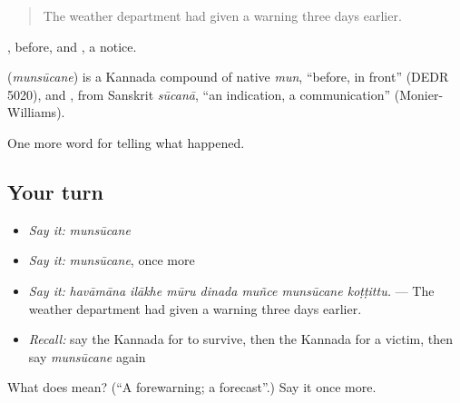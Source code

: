 \begin{quote}
The weather department had given a warning three days earlier.
\end{quote}

, before, and , a notice.

\begin{cousinweb}
\textbf{} (\emph{munsūcane}) is a Kannada compound of native \emph{mun}, \textquotedblleft{}before, in front\textquotedblright{} (DEDR 5020), and , from Sanskrit \emph{sūcanā}, \textquotedblleft{}an indication, a communication\textquotedblright{} (Monier-Williams).
\end{cousinweb}

\begin{grammarlens}[title={What you've built}]
One more word for telling what happened.
\end{grammarlens}

\subsection*{Your turn}
\begin{itemize}
\raggedright
  \item \emph{Say it:} \emph{munsūcane}
  \item \emph{Say it:} \emph{munsūcane}, once more
  \item \emph{Say it:} \emph{havāmāna ilākhe mūru dinada muñce munsūcane koṭṭittu.} — The weather department had given a warning three days earlier.
  \item \emph{Recall:} say the Kannada for to survive, then the Kannada for a victim, then say \emph{munsūcane} again
\end{itemize}

\begin{tcolorbox}[breakable,colback=teal!4,colframe=teal!35!black,title={Before you move on}]
What does  mean? (\textquotedblleft{}A forewarning; a forecast\textquotedblright{}.) Say it once more.
\end{tcolorbox}

